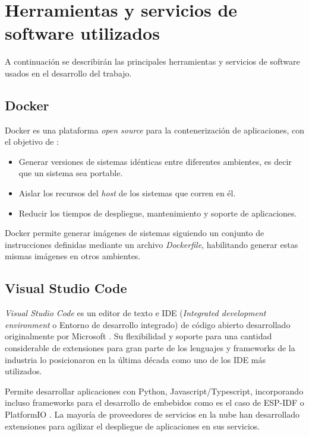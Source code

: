 \section{Herramientas y servicios de software utilizados}

A continuación se describirán las principales herramientas y servicios de software usados en el desarrollo del trabajo.

\subsection{Docker}

Docker es una plataforma \textit{open source} para la contenerización de aplicaciones, con el objetivo de \citep{DOCKER:1}:
\begin{itemize}
	\item Generar versiones de sistemas idénticas entre diferentes ambientes, es decir que un sistema sea portable.
	\item Aislar los recursos del \textit{host} de los sistemas que corren en él.
	\item Reducir los tiempos de despliegue, mantenimiento y soporte de aplicaciones.
\end{itemize}

Docker permite generar imágenes de sistemas siguiendo un conjunto de instrucciones definidas mediante un archivo \textit{Dockerfile}, habilitando generar estas mismas imágenes en otros ambientes.

\subsection{Visual Studio Code}

\textit{Visual Studio Code} es un editor de texto e IDE (\textit{Integrated development environment} o Entorno de desarrollo integrado) de código abierto desarrollado originalmente por Microsoft \citep{VSCODE:1}. Su flexibilidad y soporte para una cantidad considerable de extensiones para gran parte de los lenguajes y frameworks de la industria lo posicionaron en la última década como uno de los IDE más utilizados.

Permite desarrollar aplicaciones con Python, Javascript/Typescript, incorporando incluso frameworks para el desarrollo de embebidos como es el caso de ESP-IDF \citep{ESPIDF:1} o PlatformIO \citep{PLATFORMIO:1}. La mayoría de proveedores de servicios en la nube han desarrollado extensiones para agilizar el despliegue de aplicaciones en sus servicios.

